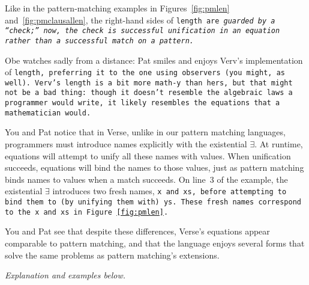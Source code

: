 \documentclass[manuscript,screen,review, 12pt]{acmart}
\begin{document}
    Like in the pattern-matching examples in Figures~\ref{fig:pmlen}
    and~\ref{fig:pmclausallen}, the right-hand sides of \tt{length} are
    \it{guarded} by a “check;” now, the check is successful unification in an
    equation rather than a successful match on a pattern. 

    Obe watches sadly from a distance: Pat smiles and enjoys Verv's
    implementation of \tt{length}, preferring it to the one using observers (you
    might, as well). Verv's \tt{length} is a bit more math-y than hers, but that
    might not be a bad thing: though it doesn't resemble the algebraic laws a
    programmer would write, it likely resembles the equations that a
    mathematician would.     
    
    You and Pat notice that in Verse, unlike in our pattern matching languages,
    programmers must introduce names explicitly with the existential $\exists$.
    At runtime, equations will attempt to unify all these names with values.
    When unification succeeds, equations will bind the names to those values,
    just as pattern matching binds names to values when a match succeeds. On
    line~3 of the example, the existential $\exists$ introduces two fresh names,
    \tt{x} and \tt{xs}, before attempting to bind them to (by unifying them
    with) \tt{ys}. These fresh names correspond to the \tt{x} and \tt{xs} in
    Figure \ref{fig:pmlen}. 

    You and Pat see that despite these differences, Verse's equations appear
    comparable to pattern matching, and that the language enjoys several forms
    that solve the same problems as pattern matching's extensions. 

    \it{Explanation and examples below.}
    
\end{document}
